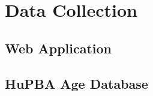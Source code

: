 \chapter{Data Collection} \label{chap:system}

\section{Web Application}

\section{HuPBA Age Database}